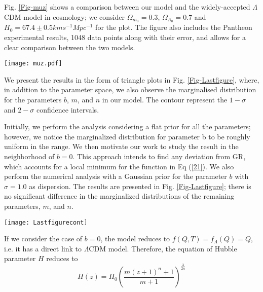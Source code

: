 Fig. \ref{Fig-muz} shows a comparison between our model and the widely-accepted $\Lambda$CDM model in cosmology; we consider $\Omega_{m_{0}}= 0.3$, $\Omega_{\Lambda_{0}} = 0.7$ and $H_{0}= 67.4\pm 0.5km s^{-1}Mpc^{-1}$ \cite{Planck} for the plot. The figure also includes the Pantheon experimental results, 1048 data points along with their error, and allows for a clear comparison between the two models.

\begin{figure*}[htbp]
\centering
\texttt{[image: muz.pdf]}
\centering \caption{The plot of distance modulus $\mu(z)$ vs. redshift $z$ for our model shown in red line and $\Lambda$CDM in black dotted line which shows nice fit to the 1048 points of the Pantheon datasets shown with it's error bars.}
 \label{Fig-muz}
\end{figure*}

We present the results in the form of triangle plots in Fig. \ref{Fig-Lastfigure}, where, in addition to the parameter space, we also observe the marginalised distribution for the parameters $b$, $m$, and $n$ in our model.  The contour represent the $1-\sigma$ and $ 2-\sigma $ confidence intervals.

Initially, we perform the analysis considering a flat prior for all the parameters; however, we notice the marginalized distribution for parameter b to be roughly uniform in the range. We then motivate our work to study the result in the neighborhood of $b=0$. This approach intends to find any deviation from GR, which accounts for a local minimum for the function in Eq (\ref{21}). We also perform the numerical analysis with a Gaussian prior for the parameter $b$ with $\sigma=1.0$ as dispersion. The results are presented in Fig. \ref{Fig-Lastfigure}; there is no significant difference in the marginalized distributions of the remaining parameters, $m$, and $n$. 

\begin{figure*}[htbp]
\centering
\texttt{[image: Lastfigurecont]}
\caption{The plot compares the two numerical analyses with different prior distributions for the parameter $b$. For either case, we considered a uniform distribution for the other two parameters, $m$, and $n$. The counter represent $1-\sigma$ and $ 2-\sigma $ confidence intervals.} \label{Fig-Lastfigure}
\end{figure*}

If we consider the case of $b=0$, the model reduces to $f(Q,T)= f_{\Lambda}(Q)=Q$, i.e. it has a direct link to $\Lambda$CDM model. Therefore, the equation of Hubble parameter $H$ reduces to 
\begin{equation}
H(z)=H_{0}\left(\frac{m (z+1)^n+1}{m+1}\right)^{\frac{3}{2 n}}
\end{equation}

